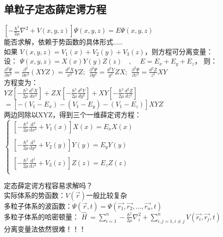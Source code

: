\subsection{单粒子定态薛定谔方程}
	{$\displaystyle   \left [ -\frac{\hbar^2}{2\mu }\nabla ^2 + V(x,y,z) \right ]\Psi (x,y,z) =E \Psi (x,y,z)  $  } \\ \vspace{0.3cm}
能否求解，依赖于势函数的具体形式..... \\ \vspace{0.3cm}
如果 $ V(x,y,z)=V_1(x)+V_2(y)+V_3(z) $，则方程可分离变量： \\ 
设： $\Psi(x,y,z)=X(x)Y(y)Z(z)$~~,~~ $ E=E_x+E_y+E_z$， 则： \\ 
{$\displaystyle  \frac{\partial^2  \Psi}{\partial  x^2}  =  \frac{\partial ^2 }{\partial  x^2} (XYZ) = \frac{d^2X}{ x^2} YZ ; ~~  \frac{\partial^2  \Psi}{\partial  y^2}  =\frac{d^2Y}{ y^2} ZX ; ~~  \frac{\partial^2  \Psi}{\partial  z^2}  = \frac{d^2Z}{ z^2} XY  $  } \\ 
方程变为： \\ 
{$\displaystyle  YZ \left [ -\frac{\hbar^2}{2\mu } \frac{d^2X}{dx^2} \right ]  +  ZX \left [ -\frac{\hbar^2}{2\mu } \frac{d^2Y}{dy^2} \right ]  + XY \left [ -\frac{\hbar^2}{2\mu } \frac{d^2Z}{dz^2} \right ] $}  \\ 
{$\displaystyle  =\left [ -(V_1-E_x) - (V_1-E_y) - (V_1-E_z)  \right ]  XYZ  $  } \\ 
两边同除以XYZ，得到三个一维薛定谔方程：\\ 
{ $ \displaystyle
\begin{cases}
		\left [ -\frac{\hbar^2}{2\mu} \frac{\mathrm{d} ^2}{\mathrm{d} x^2} +V_1(x) \right ]X(x)=E_xX(x) \\  
		\\
		\left [ -\frac{\hbar^2}{2\mu} \frac{\mathrm{d} ^2}{\mathrm{d} y^2} +V_2(y) \right ]Y(y)=E_yY(y) \\  
		\\
		\left [ -\frac{\hbar^2}{2\mu} \frac{\mathrm{d} ^2}{\mathrm{d} z^2} +V_3(z) \right ]Z(z)=E_zZ(z) \\
\end{cases}
	$}\\

\begin{remark}
	定态薛定谔方程容易求解吗？\\ 
	实际体系的势函数：$V(\vec{r}) $一般比较复杂\\ 
	多粒子体系的波函数：$ \displaystyle  \Psi (\vec{r},t ) =\Psi (\vec{r_1},\vec{r_2},...,\vec{r_n},t ) $  \\ 
	多粒子体系的哈密顿量： $ \displaystyle  \hat{H} ~=\sum_{i=1}^{n} -\frac{\hbar^2}{2\mu }\nabla ^2 _i + \sum_{i,j=1, i\ne j}^{n}  V(\vec{r_i},\vec{r_j},t ) $ \\ 
	分离变量法依然很难！！！
\end{remark}


